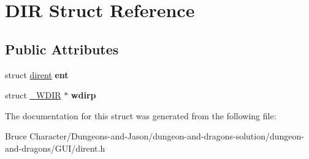 \hypertarget{struct_d_i_r}{}\section{D\+IR Struct Reference}
\label{struct_d_i_r}
\subsection*{Public Attributes}
\begin{DoxyCompactItemize}
\item 
\hypertarget{struct_d_i_r_a59e9f5211cbb2f8e5b2807ccfdd2a7fc}{}\label{struct_d_i_r_a59e9f5211cbb2f8e5b2807ccfdd2a7fc} 
struct \hyperlink{structdirent}{dirent} {\bfseries ent}
\item 
\hypertarget{struct_d_i_r_a29362d4a3d7f809d0f5418b26cac5d41}{}\label{struct_d_i_r_a29362d4a3d7f809d0f5418b26cac5d41} 
struct \hyperlink{struct___w_d_i_r}{\+\_\+\+W\+D\+IR} $\ast$ {\bfseries wdirp}
\end{DoxyCompactItemize}


The documentation for this struct was generated from the following file\+:\begin{DoxyCompactItemize}
\item 
Bruce Character/\+Dungeons-\/and-\/\+Jason/dungeon-\/and-\/dragons-\/solution/dungeon-\/and-\/dragons/\+G\+U\+I/dirent.\+h\end{DoxyCompactItemize}
